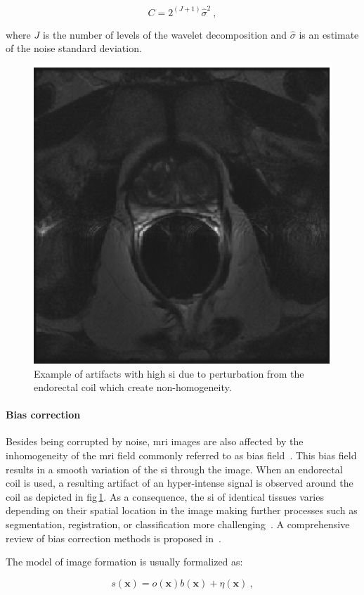 \begin{equation}
	C=2^{(J+1)}\hat{\sigma}^2 \ ,
	\label{eq:nowakC}
\end{equation}

\noindent where $J$ is the number of levels of the wavelet decomposition and $\hat{\sigma}$ is an estimate of the noise standard deviation.

\begin{figure}
\centering
\includegraphics[width=0.3\linewidth]{3_review/figures/processing/pre-processing/bias/t2w_bias_antenna.eps}
\caption[Non-homogeneity artifacts due to perturbation of the endorectal coil.]{Example of artifacts with high \acs*{si} due to perturbation from the endorectal coil which create non-homogeneity.}
\label{fig:bias}
\end{figure}


\paragraph{Bias correction} Besides being corrupted by noise, \ac{mri} images are also affected by the inhomogeneity of the \ac{mri} field commonly referred to as bias field~\cite{Styner2000}.
This bias field results in a smooth variation of the \ac{si} through the image.
When an endorectal coil is used, a resulting artifact of an hyper-intense signal is observed around the coil as depicted in \acs{fig}\,\ref{fig:bias}.
As a consequence, the \ac{si} of identical tissues varies depending on their spatial location in the image making further processes such as segmentation, registration, or classification more challenging~\cite{Jungke1987,Vovk2007}.
A comprehensive review of bias correction methods is proposed in~\cite{Vovk2007}.

The model of image formation is usually formalized as:

\begin{equation}
	s(\mathbf{x}) = o(\mathbf{x})b(\mathbf{x}) + \eta(\mathbf{x}) \ ,
	\label{eq:biasmodel}
\end{equation}

